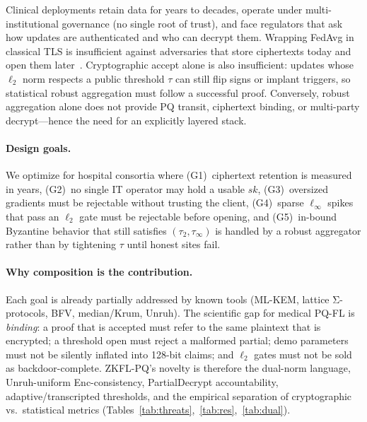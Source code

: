 \documentclass[conference]{IEEEtran}
\begin{document}
Clinical deployments retain data for years to decades, operate under multi-institutional governance (no single root of trust), and face regulators that ask how updates are authenticated and who can decrypt them. Wrapping FedAvg in classical TLS is insufficient against adversaries that store ciphertexts today and open them later~\cite{mosca2018cybersecurity}. Cryptographic accept alone is also insufficient: updates whose $\ell_2$ norm respects a public threshold $\tau$ can still flip signs or implant triggers, so statistical robust aggregation must follow a successful proof. Conversely, robust aggregation alone does not provide PQ transit, ciphertext binding, or multi-party decrypt---hence the need for an explicitly layered stack.

\paragraph{Design goals.}
We optimize for hospital consortia where (G1)~ciphertext retention is measured in years, (G2)~no single IT operator may hold a usable $sk$, (G3)~oversized gradients must be rejectable without trusting the client, (G4)~sparse $\ell_\infty$ spikes that pass an $\ell_2$ gate must be rejectable before opening, and (G5)~in-bound Byzantine behavior that still satisfies $(\tau_2,\tau_\infty)$ is handled by a robust aggregator rather than by tightening $\tau$ until honest sites fail.

\paragraph{Why composition is the contribution.}
Each goal is already partially addressed by known tools (ML-KEM, lattice Σ-protocols, BFV, median/Krum, Unruh). The scientific gap for medical PQ-FL is \emph{binding}: a proof that is accepted must refer to the same plaintext that is encrypted; a threshold open must reject a malformed partial; demo parameters must not be silently inflated into 128-bit claims; and $\ell_2$ gates must not be sold as backdoor-complete. ZKFL-PQ's novelty is therefore the dual-norm language, Unruh-uniform Enc-consistency, PartialDecrypt accountability, adaptive/transcripted thresholds, and the empirical separation of cryptographic vs.\ statistical metrics (Tables~\ref{tab:threats},~\ref{tab:res},~\ref{tab:dual}).
\end{document}

